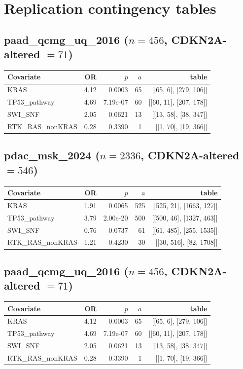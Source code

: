 \section{Replication contingency tables}
\subsection{paad\_qcmg\_uq\_2016 ($n=456$, CDKN2A-altered $=71$)}
\begin{center}\begin{tabular}{lrrrr}
\hline\hline Covariate & OR & $p$ & $a$ & table \\ \hline
KRAS & 4.12 & 0.0003 & 65 & [[65, 6], [279, 106]] \\
TP53\_pathway & 4.69 & 7.19e-07 & 60 & [[60, 11], [207, 178]] \\
SWI\_SNF & 2.05 & 0.0621 & 13 & [[13, 58], [38, 347]] \\
RTK\_RAS\_nonKRAS & 0.28 & 0.3390 & 1 & [[1, 70], [19, 366]] \\
\hline\hline\end{tabular}\end{center}
\subsection{pdac\_msk\_2024 ($n=2336$, CDKN2A-altered $=546$)}
\begin{center}\begin{tabular}{lrrrr}
\hline\hline Covariate & OR & $p$ & $a$ & table \\ \hline
KRAS & 1.91 & 0.0065 & 525 & [[525, 21], [1663, 127]] \\
TP53\_pathway & 3.79 & 2.00e-20 & 500 & [[500, 46], [1327, 463]] \\
SWI\_SNF & 0.76 & 0.0737 & 61 & [[61, 485], [255, 1535]] \\
RTK\_RAS\_nonKRAS & 1.21 & 0.4230 & 30 & [[30, 516], [82, 1708]] \\
\hline\hline\end{tabular}\end{center}
\subsection{paad\_qcmg\_uq\_2016 ($n=456$, CDKN2A-altered $=71$)}
\begin{center}\begin{tabular}{lrrrr}
\hline\hline Covariate & OR & $p$ & $a$ & table \\ \hline
KRAS & 4.12 & 0.0003 & 65 & [[65, 6], [279, 106]] \\
TP53\_pathway & 4.69 & 7.19e-07 & 60 & [[60, 11], [207, 178]] \\
SWI\_SNF & 2.05 & 0.0621 & 13 & [[13, 58], [38, 347]] \\
RTK\_RAS\_nonKRAS & 0.28 & 0.3390 & 1 & [[1, 70], [19, 366]] \\
\hline\hline\end{tabular}\end{center}
